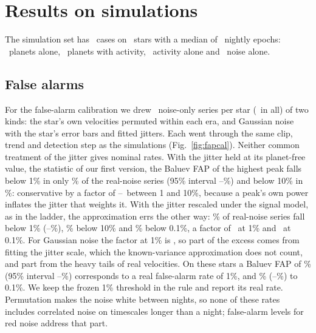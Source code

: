\section{Results on simulations}
\label{sec:simres}

The simulation set has \nmSimCases\ cases on \nmSimStars\ stars with a median of
\nmSimMedianN\ nightly epochs: \nmNPlanetOnly\ planets alone, \nmNPlanetAct\ planets with
activity, \nmNActOnly\ activity alone and \nmNNoiseOnly\ noise alone.

\subsection{False alarms}
\label{sec:fap}

For the false-alarm calibration we drew \nmFapPerStar\ noise-only series per star
(\nmFapSeries\ in all) of two kinds: the star's own velocities permuted within each
era, and Gaussian noise with the star's error bars and fitted jitters. Each went
through the same clip, trend and detection step as the simulations
(Fig.~\ref{fig:fapcal}). Neither common treatment of the jitter gives nominal rates.
With the jitter held at its planet-free value, the statistic of our first version, the
Baluev FAP of the highest peak falls below 1\% in only \nmFapPermFixOne\% of the
real-noise series (95\% interval \nmFapPermFixOneLo--\nmFapPermFixOneHi\%) and below
10\% in \nmFapPermFixTen\%: conservative by a factor of
\nmFapFixFactorLo--\nmFapFixFactorHi\ between 1 and 10\%, because a peak's own power
inflates the jitter that weights it. With the jitter rescaled under the signal model, as
in the ladder, the approximation errs the other way: \nmFapPermLROne\% of real-noise
series fall below 1\% (\nmFapPermLROneLo--\nmFapPermLROneHi\%), \nmFapPermLRTen\% below
10\% and \nmFapPermLRTenth\% below 0.1\%, a factor of \nmFapLiberalPerm\ at 1\% and
\nmFapLiberalPermTenth\ at 0.1\%. For Gaussian noise the factor at 1\% is
\nmFapLiberalGauss, so part of the excess comes from fitting the jitter scale, which the
known-variance approximation does not count, and part from the heavy tails of real
velocities. On these stars a Baluev FAP of \nmFapEmpOne\% (95\% interval
\nmFapEmpOneLo--\nmFapEmpOneHi\%) corresponds to a real false-alarm rate of 1\%, and
\nmFapEmpTenth\% (\nmFapEmpTenthLo--\nmFapEmpTenthHi\%) to 0.1\%. We keep the frozen 1\%
threshold in the rule and report its real rate. Permutation makes the noise white
between nights, so none of these rates includes correlated noise on timescales longer
than a night; false-alarm levels for red noise \citep{Ejaz2026} address that part.

